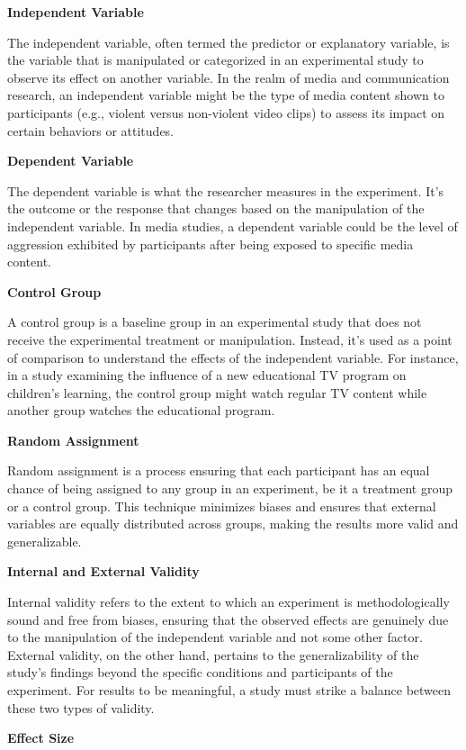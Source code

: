 \documentclass[
  b5paper]{book}
\begin{document}
\textbf{Independent Variable}

The independent variable, often termed the predictor or explanatory variable, is the variable that is manipulated or categorized in an experimental study to observe its effect on another variable. In the realm of media and communication research, an independent variable might be the type of media content shown to participants (e.g., violent versus non-violent video clips) to assess its impact on certain behaviors or attitudes.

\textbf{Dependent Variable}

The dependent variable is what the researcher measures in the experiment. It's the outcome or the response that changes based on the manipulation of the independent variable. In media studies, a dependent variable could be the level of aggression exhibited by participants after being exposed to specific media content.

\textbf{Control Group}

A control group is a baseline group in an experimental study that does not receive the experimental treatment or manipulation. Instead, it's used as a point of comparison to understand the effects of the independent variable. For instance, in a study examining the influence of a new educational TV program on children's learning, the control group might watch regular TV content while another group watches the educational program.

\textbf{Random Assignment}

Random assignment is a process ensuring that each participant has an equal chance of being assigned to any group in an experiment, be it a treatment group or a control group. This technique minimizes biases and ensures that external variables are equally distributed across groups, making the results more valid and generalizable.

\textbf{Internal and External Validity}

Internal validity refers to the extent to which an experiment is methodologically sound and free from biases, ensuring that the observed effects are genuinely due to the manipulation of the independent variable and not some other factor. External validity, on the other hand, pertains to the generalizability of the study's findings beyond the specific conditions and participants of the experiment. For results to be meaningful, a study must strike a balance between these two types of validity.

\textbf{Effect Size}
\end{document}

